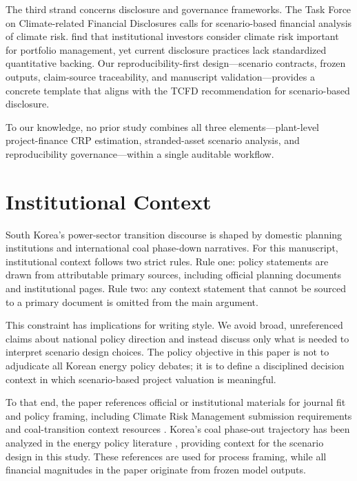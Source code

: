 \documentclass[preprint,12pt]{elsarticle}
\begin{document}
The third strand concerns disclosure and governance frameworks. The Task Force on Climate-related Financial Disclosures \citep{tcfd2017recommendations} calls for scenario-based financial analysis of climate risk. \citet{krueger2020importance} find that institutional investors consider climate risk important for portfolio management, yet current disclosure practices lack standardized quantitative backing. Our reproducibility-first design---scenario contracts, frozen outputs, claim-source traceability, and manuscript validation---provides a concrete template that aligns with the TCFD recommendation for scenario-based disclosure.

To our knowledge, no prior study combines all three elements---plant-level project-finance CRP estimation, stranded-asset scenario analysis, and reproducibility governance---within a single auditable workflow.

\section{Institutional Context}
South Korea's power-sector transition discourse is shaped by domestic planning institutions and international coal phase-down narratives. For this manuscript, institutional context follows two strict rules. Rule one: policy statements are drawn from attributable primary sources, including official planning documents and institutional pages. Rule two: any context statement that cannot be sourced to a primary document is omitted from the main argument.

This constraint has implications for writing style. We avoid broad, unreferenced claims about national policy direction and instead discuss only what is needed to interpret scenario design choices. The policy objective in this paper is not to adjudicate all Korean energy policy debates; it is to define a disciplined decision context in which scenario-based project valuation is meaningful.

To that end, the paper references official or institutional materials for journal fit and policy framing, including Climate Risk Management submission requirements and coal-transition context resources \citep{crmguide2026,crmjournal2026,ppca2025,motie2025}. Korea's coal phase-out trajectory has been analyzed in the energy policy literature \citep{yun2019korea,lee2023korea}, providing context for the scenario design in this study. These references are used for process framing, while all financial magnitudes in the paper originate from frozen model outputs.
\end{document}
